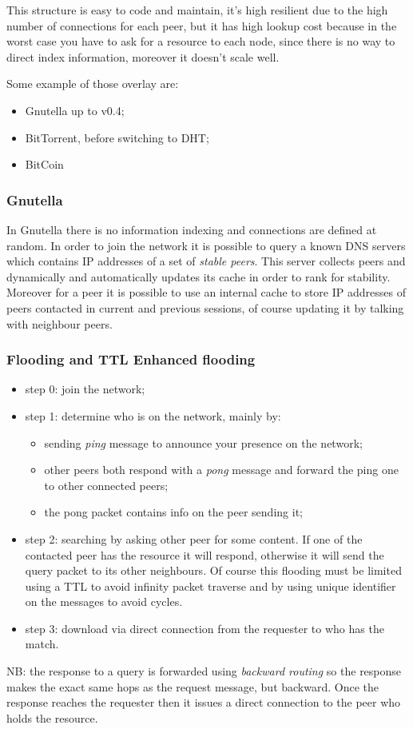 This structure is easy to code and maintain, it's high resilient due to the high number of connections for each peer, but it has high lookup cost because in the worst case you have to ask for a resource to each node, since there is no way to direct index information, moreover it doesn't scale well.

Some example of those overlay are:
\begin{itemize}
    \item Gnutella up to v0.4;
    \item BitTorrent, before switching to DHT;
    \item BitCoin
\end{itemize}

\subsubsection{Gnutella}
In Gnutella there is no information indexing and connections are defined at random.
In order to join the network it is possible to query a known DNS servers which contains IP addresses of a set of \emph{stable peers}.
This server collects peers and dynamically and automatically updates its cache in order to rank for stability.
Moreover for a peer it is possible to use an internal cache to store IP addresses of peers contacted in current and previous sessions, of course updating it by talking with neighbour peers.

\subsubsection{Flooding and TTL Enhanced flooding}
\begin{itemize}
    \item step 0: join the network;
    \item step 1: determine who is on the network, mainly by:
    \begin{itemize}
        \item sending \emph{ping} message to announce your presence on the network;
        \item other peers both respond with a \emph{pong} message and forward the ping one to other connected peers;
        \item the pong packet contains info on the peer sending it;
    \end{itemize}
    \item step 2: searching by asking other peer for some content.
    If one of the contacted peer has the resource it will respond, otherwise it will send the query packet to its other neighbours.
    Of course this flooding must be limited using a TTL to avoid infinity packet traverse and by using unique identifier on the messages to avoid cycles.
    \item step 3: download via direct connection from the requester to who has the match.
\end{itemize}
NB: the response to a query is forwarded using \emph{backward routing} so the response makes the exact same hops as the request message, but backward.
Once the response reaches the requester then it issues a direct connection to the peer who holds the resource.

